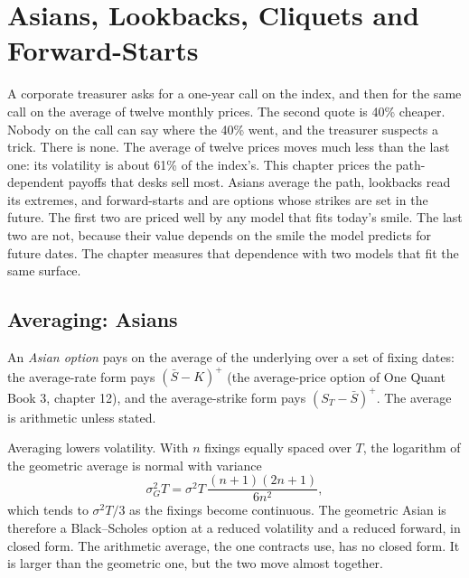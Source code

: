 \chapter{Asians, Lookbacks, Cliquets and Forward-Starts}\label{ch:dv:asians-lookbacks-cliquets-and-forward-starts}

A corporate treasurer asks for a one-year call on the index, and then for the same call on the average of twelve
monthly prices. The second quote is 40\% cheaper. Nobody on the call can say where the 40\% went, and the treasurer
suspects a trick. There is none. The average of twelve prices moves much less than the last one: its volatility is
about 61\% of the index's. This chapter prices the path-dependent payoffs that desks sell most. Asians average the
path, lookbacks read its extremes, and forward-starts and  are options whose strikes are set in the future.
The first two are priced well by any model that fits today's smile. The last two are not, because their value
depends on the smile the model predicts for future dates. The chapter measures that dependence with two models that
fit the same surface.

\section{Averaging: Asians}

\begin{definition}\label{def:dv:asians-lookbacks-cliquets-and-forward-starts:asian}
An \emph{Asian option} pays on the average of the underlying over a set of fixing dates: the
average-rate form pays $(\bar S-K)^+$ (the average-price option of One Quant Book 3, chapter 12), and the average-strike
form pays $(S_T-\bar S)^+$. The average is arithmetic unless stated.
\end{definition}

Averaging lowers volatility. With $n$ fixings equally spaced over $T$, the logarithm of the geometric average is normal
with variance
\[
\sigma_G^2T=\sigma^2T\,\frac{(n+1)(2n+1)}{6n^2},
\]
which tends to $\sigma^2T/3$ as the fixings become continuous. The geometric Asian is therefore a Black--Scholes option
at a reduced volatility and a reduced forward, in closed form. The arithmetic average, the one contracts use, has no
closed form. It is larger than the geometric one, but the two move almost together.

